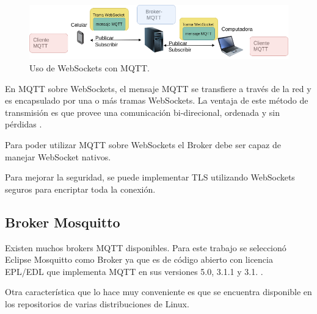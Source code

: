 \begin{figure}[ht]
	\centering
	\includegraphics[scale=.45]{./Figures/websocket.png}
	\caption{Uso de WebSockets con MQTT.}
	\label{fig:WebSockets MQTT}
\end{figure}

En MQTT sobre WebSockets, el mensaje MQTT se transfiere a través de la red y es encapsulado por una o más tramas WebSockets. La ventaja de este método de transmisión es que provee una comunicación bi-direcional, ordenada y sin pérdidas \citep{WEBSITE:6} .

Para poder utilizar MQTT sobre WebSockets el Broker debe ser capaz de manejar WebSocket nativos. 

Para mejorar la seguridad, se puede implementar TLS utilizando WebSockets seguros para encriptar toda la conexión.

\label{subsec:Broker Mosquitto}
\subsection{Broker Mosquitto}

Existen muchos brokers MQTT disponibles. Para este trabajo se seleccionó Eclipse Mosquitto como Broker ya que es de código abierto con licencia EPL/EDL que implementa MQTT en sus versiones 5.0, 3.1.1 y 3.1. \citep{WEBSITE:7}.

Otra característica que lo hace muy conveniente es que se encuentra disponible en los repositorios de varias distribuciones de Linux. 






